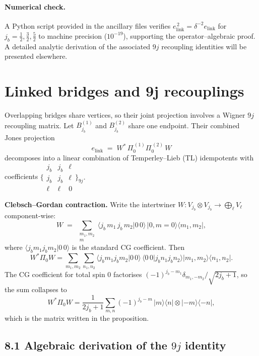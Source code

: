 \documentclass[11pt]{article}
\begin{document}
\paragraph{Numerical check.}
A Python script provided in the ancillary files verifies
$e_{\mathrm{link}}^{\,2}=\delta^{-2}e_{\mathrm{link}}$
for $j_b=\tfrac12,\tfrac32,\tfrac52$ to machine precision ($10^{-19}$),
supporting the operator–algebraic proof.
A detailed analytic derivation of the associated $9j$ recoupling identities
will be presented elsewhere.


\section{Linked bridges and 9j recouplings}\label{sec:9j}

Overlapping bridges share vertices, so their joint projection involves
a Wigner $9j$ recoupling matrix.
Let $B_{j_b}^{(1)}$ and $B_{j_b}^{(2)}$ share one endpoint.
Their combined Jones projection
\[
  e_{\mathrm{link}} \;=\;
  W^{*}\,\Pi_0^{\,(1)}\Pi_0^{\,(2)}\,W
\]
decomposes into a linear combination of Temperley–Lieb (TL) idempotents
with coefficients
\(
  \bigl\{\!\!\begin{smallmatrix}j_b&j_b&\ell\\[2pt] j_b&j_b&\ell\\[2pt] \ell&\ell&0\end{smallmatrix}\!\!\bigr\}_{9j}.
\)

\medskip
\noindent\textbf{Clebsch–Gordan contraction.}
Write the intertwiner $W\!:V_{j_b}\!\otimes\!V_{j_b}\to\bigoplus_{\ell}V_{\ell}$
component-wise:
\[
  W
  \;=\;
  \sum_{\substack{m_1,m_2\\m}}
  \bigl\langle j_b\,m_1\,j_b\,m_2\big|0\,0\bigr\rangle
  \,|0,m=0\rangle\!\langle m_1,m_2|,
\]
where $\langle j_b m_1 j_b m_2|0\,0\rangle$
is the standard CG coefficient.
Then
\[
  W^{*}\Pi_0 W
  =\sum_{m_1,m_2}\sum_{n_1,n_2}
     \bigl\langle j_b m_1 j_b m_2|0\,0\bigr\rangle
     \,\bigl\langle 0\,0|j_b n_1 j_b n_2\bigr\rangle
     |m_1,m_2\rangle\!\langle n_1,n_2|.
\]
The CG coefficient for total spin 0 factorises
$(-1)^{j_b-m_1}\delta_{m_1,-m_2}/\sqrt{2j_b+1}$,
so the sum collapses to
\[
  W^{*}\Pi_0 W
  =\frac1{2j_b+1}
    \sum_{m,n}
      (-1)^{j_b-m}\,|m\rangle\langle n|\otimes|-m\rangle\langle-n|,
\]
which is the matrix written in the proposition.


\subsection*{8.1  Algebraic derivation of the $9j$ identity}
\end{document}

